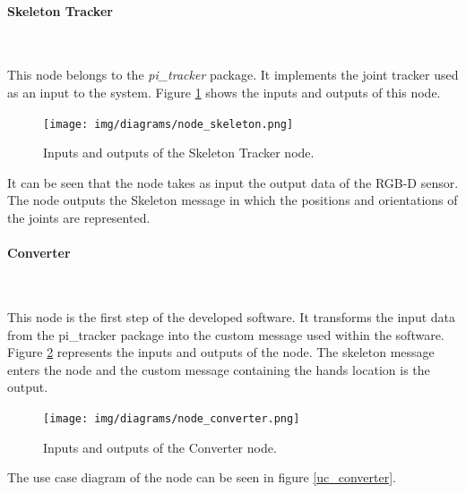 \newpage
\paragraph{\large Skeleton Tracker}\mbox{}\\
\label{skeleton_tracker}

This node belongs to the \textit{pi\_tracker} package. 
It implements the joint tracker used as an input to the system. 
Figure \ref{diagram_skeleton} shows the inputs and outputs of this node. 

		\begin{figure}[H]
			\begin{center}
			\texttt{[image: img/diagrams/node\_skeleton.png]}
			\caption[Skeleton Tracker I/O]{Inputs and outputs of the Skeleton Tracker node.}
			\label{diagram_skeleton}
			\end{center}
		\end{figure}

It can be seen that the node takes as input the output data of the RGB-D sensor. 
The node outputs the Skeleton message in which the positions and orientations of the joints are represented. 





\paragraph{Converter}\mbox{}\\
		\label{converter}

	This node is the first step of the developed software. 
	It transforms the input data from the pi\_tracker package into the custom message used within the software. 
	Figure \ref{node_converter} represents the inputs and outputs of the node. 
	The skeleton message enters the node and the custom message containing the hands location is the output. 

		\begin{figure}[H]
			\begin{center}
			\texttt{[image: img/diagrams/node\_converter.png]}
			\caption[Converter node I/O]{Inputs and outputs of the Converter node.}		
			\label{node_converter}
			\end{center}
		\end{figure}

	The use case diagram of the node can be seen in figure \ref{uc_converter}. 

